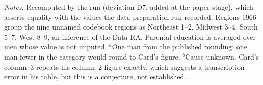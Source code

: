 \begin{table}[tbp]
\smallskip
\begin{minipage}{0.95\linewidth}
\footnotesize
\emph{Notes.} Recomputed by the run  (deviation D7, added at the paper
stage), which asserts equality with the values the data-preparation run recorded. Regions
1966 group the nine unnamed codebook regions as Northeast 1--2, Midwest 3--4, South 5--7,
West 8--9, an inference of the Data RA. Parental education is averaged over men whose value
is not imputed. $^{a}$One man from the published rounding: one man fewer in the category
would round to Card's figure. $^{b}$Cause unknown. Card's column~3 repeats his
column~2 figure exactly, which suggests a transcription error in his table, but this is a
conjecture, not established.
\end{minipage}
\end{table}
